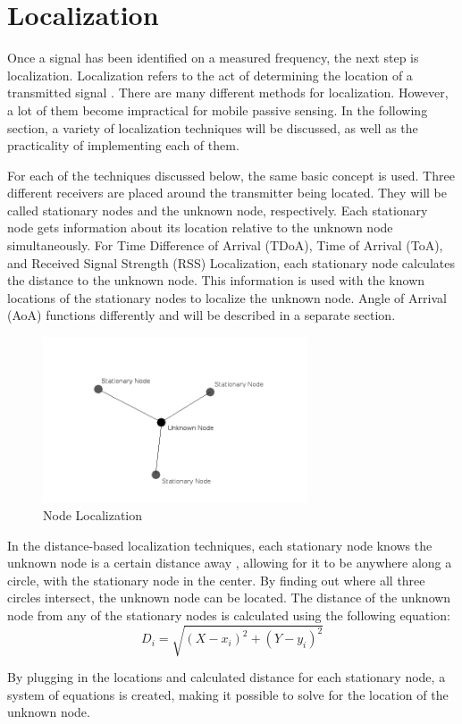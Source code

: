 \section{Localization}
Once a signal has been identified on a measured frequency, the next step is localization. Localization refers to the act of determining the location of a transmitted signal \cite{local_conf}. There are many different methods for localization. However, a lot of them become impractical for mobile passive sensing. In the following section, a variety of localization techniques will be discussed, as well as the practicality of implementing each of them.\par
For each of the techniques discussed below, the same basic concept is used. Three different receivers are placed around the transmitter being located. They will be called stationary nodes and the unknown node, respectively. Each stationary node gets information about its location relative to the unknown node simultaneously. For Time Difference of Arrival (TDoA), Time of Arrival (ToA), and Received Signal Strength (RSS) Localization, each stationary node calculates the distance to the unknown node. This information is used with the known locations of the stationary nodes to localize the unknown node.
Angle of Arrival (AoA) functions differently and will be described in a separate section.
\begin{figure}[ht]
\centering
\includegraphics[width=0.70\textwidth]{img/node-localization-lines.png}
\caption{Node Localization}
\label{fig:node_localization}
\end{figure}\par
In the distance-based localization techniques, each stationary node knows the unknown node is a certain distance away \cite{local_conf}, allowing for it to be anywhere along a circle, with the stationary node in the center. By finding out where all three circles intersect, the unknown node can be located. The distance of the unknown node from any of the stationary nodes is calculated using the following equation:
\[D_i =\sqrt{(X - x_i)^2 + (Y-y_i)^2}\]\par
By plugging in the locations and calculated distance for each stationary node, a system of equations is created, making it possible to solve for the location of the unknown node.

